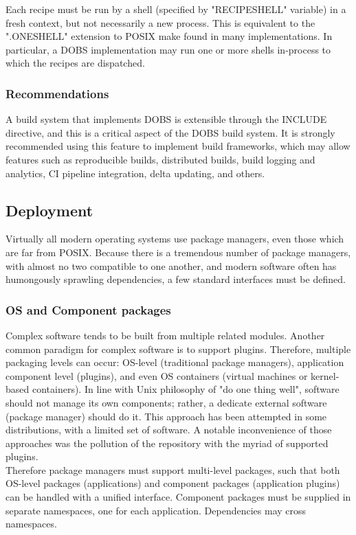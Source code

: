 Each recipe must be run by a shell (specified by "RECIPESHELL" variable) in a fresh context, but not necessarily a new process. This is equivalent to the ".ONESHELL" extension to POSIX make found in many implementations. In particular, a DOBS implementation may run one or more shells in-process to which the recipes are dispatched.
\subsubsection{Recommendations}
A build system that implements DOBS is extensible through the INCLUDE directive, and this is a critical aspect of the DOBS build system. It is strongly recommended using this feature to implement build frameworks, which may allow features such as reproducible builds, distributed builds, build logging and analytics, CI pipeline integration, delta updating, and others.
\subsection{Deployment}
Virtually all modern operating systems use package managers, even those which are far from POSIX. Because there is a tremendous number of package managers, with almost no two compatible to one another, and modern software often has humongously sprawling dependencies, a few standard interfaces must be defined.
\subsubsection{OS and Component packages}
Complex software tends to be built from multiple related modules. Another common paradigm for complex software is to support plugins. Therefore, multiple packaging levels can occur: OS-level (traditional package managers), application component level (plugins), and even OS containers (virtual machines or kernel-based containers). In line with Unix philosophy of "do one thing well", software should not manage its own components; rather, a dedicate external software (package manager) should do it. This approach has been attempted in some distributions, with a limited set of software. A notable inconvenience of those approaches was the pollution of the repository with the myriad of supported plugins.\\
Therefore package managers must support multi-level packages, such that both OS-level packages (applications) and component packages (application plugins) can be handled with a unified interface. Component packages must be supplied in separate namespaces, one for each application. Dependencies may cross namespaces.
